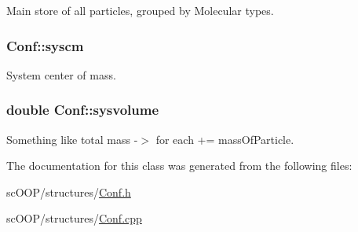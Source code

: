 Main store of all particles, grouped by Molecular types. 

\hypertarget{class_conf_a8d27bcc5bf535c39c7c0f17a078448d9}{
\subsubsection[{syscm}]{ Conf\+::syscm}}\label{class_conf_a8d27bcc5bf535c39c7c0f17a078448d9}


System center of mass. 

\hypertarget{class_conf_a0591e720e4f06449a7d37a8e3135ddb1}{
\subsubsection[{sysvolume}]{\setlength{\rightskip}{0pt plus 5cm}double Conf\+::sysvolume}}\label{class_conf_a0591e720e4f06449a7d37a8e3135ddb1}


Something like total mass -\/$>$ for each += mass\+Of\+Particle. 



The documentation for this class was generated from the following files\+:\begin{DoxyCompactItemize}
\item 
sc\+O\+O\+P/structures/\hyperlink{_conf_8h}{Conf.\+h}\item 
sc\+O\+O\+P/structures/\hyperlink{_conf_8cpp}{Conf.\+cpp}\end{DoxyCompactItemize}
